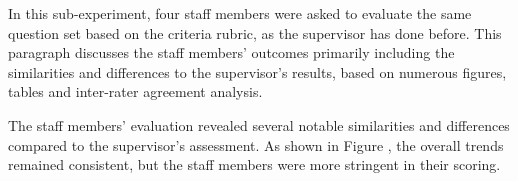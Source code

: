 
In this sub-experiment, four staff members were asked to evaluate the same question set based on the criteria rubric, as the supervisor has done before. This paragraph discusses the staff members' outcomes primarily including the similarities and differences to the supervisor's results, based on numerous figures, tables and inter-rater agreement analysis.

 The staff members' evaluation revealed several notable similarities and differences compared to the supervisor's assessment. As shown in Figure , the overall trends remained consistent, but the staff members were more stringent in their scoring.





